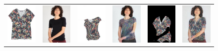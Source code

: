 \begin{figure}[t]
\begin{tabular}{cc|cc|cc}
\includegraphics[width=2cm]{figures/cloth/002353_1.jpg}&
\includegraphics[width=2cm]{figures/image/019581_0.jpg}&
\includegraphics[width=2cm]{figures/cp-vton/warp-cloth/002353_1_019581_0.jpg}&
\includegraphics[width=2cm]{figures/cp-vton/try-on/002353_1_019581_0.jpg}&
\includegraphics[width=2cm]{figures/c3dwfull/002353_1_019581_0.png}&
\includegraphics[width=2cm]{figures/try-on/002353_1_019581_0.jpg}\\


\end{tabular}
\end{figure}
